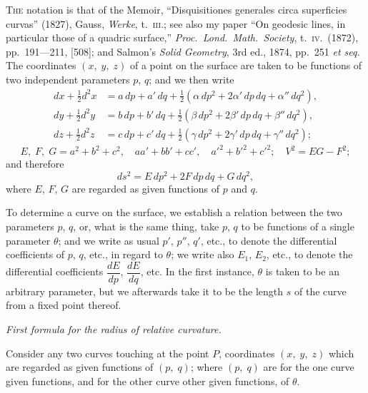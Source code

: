 \documentclass[11pt,a4paper,english]{article}
\theoremstyle{plain}
\begin{document}
\textsc{The} notation is that of the Memoir, ``Disquisitiones generales circa superficies curvas'' (1827), Gauss, \textit{Werke}, t.\ \textsc{iii}.; see also my paper ``On geodesic lines, in particular those of a quadric surface,'' \textit{Proc.\ Lond.\ Math.\ Society}, t.\ \textsc{iv}.\ (1872), pp.\ 191---211, [508]; and Salmon's \textit{Solid Geometry}, 3rd ed., 1874, pp.\ 251 \textit{et seq.} The coordinates $(x,\; y,\; z)$ of a point on the surface are taken to be functions of two independent parameters $p$, $q$; and we then write
\begin{align*}
dx + \tfrac{1}{2}d^2x &= a\,dp + a'\,dq + \tfrac{1}{2}(\alpha\,dp^2 + 2\alpha'\,dp\,dq + \alpha''\,dq^2), \\
dy + \tfrac{1}{2}d^2y &= b\,dp + b'\,dq + \tfrac{1}{2}(\beta\,dp^2 + 2\beta'\,dp\,dq + \beta''\,dq^2), \\
dz + \tfrac{1}{2}d^2z &= c\,dp + c'\,dq + \tfrac{1}{2}(\gamma\,dp^2 + 2\gamma'\,dp\,dq + \gamma''\,dq^2);
\end{align*}
\[
E,\; F,\; G = a^2 + b^2 + c^2,\quad aa' + bb' + cc',\quad a'^2 + b'^2 + c'^2;\quad V^2 = EG - F^2;
\]
and therefore
\[
ds^2 = E\,dp^2 + 2F\,dp\,dq + G\,dq^2,
\]
where $E$, $F$, $G$ are regarded as given functions of $p$ and $q$.

To determine a curve on the surface, we establish a relation between the two parameters $p$, $q$, or, what is the same thing, take $p$, $q$ to be functions of a single parameter $\theta$; and we write as usual $p'$, $p''$, $q'$, etc., to denote the differential coefficients of $p$, $q$, etc., in regard to $\theta$; we write also $E_1$, $E_2$, etc., to denote the differential coefficients $\dfrac{dE}{dp}$, $\dfrac{dE}{dq}$, etc. In the first instance, $\theta$ is taken to be an arbitrary parameter, but we afterwards take it to be the length $s$ of the curve from a fixed point thereof.

\begin{center}
\textit{First formula for the radius of relative curvature.}
\end{center}

Consider any two curves touching at the point $P$, coordinates $(x,\; y,\; z)$ which are regarded as given functions of $(p,\; q)$; where $(p,\; q)$ are for the one curve given functions, and for the other curve other given functions, of $\theta$.
\end{document}
